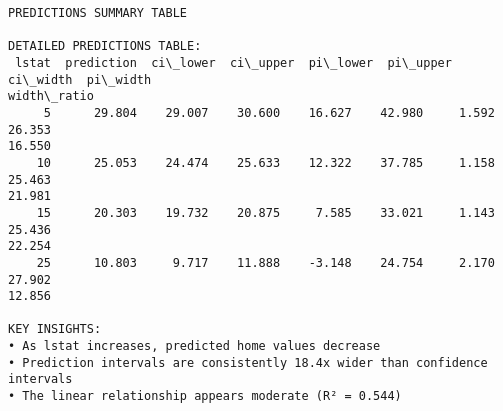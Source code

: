 \documentclass[8pt, twocolumn]{extarticle}
\begin{document}
    \centering
    \begin{Verbatim}[commandchars=\\\{\}]
PREDICTIONS SUMMARY TABLE

DETAILED PREDICTIONS TABLE:
 lstat  prediction  ci\_lower  ci\_upper  pi\_lower  pi\_upper  ci\_width  pi\_width
width\_ratio
     5      29.804    29.007    30.600    16.627    42.980     1.592    26.353
16.550
    10      25.053    24.474    25.633    12.322    37.785     1.158    25.463
21.981
    15      20.303    19.732    20.875     7.585    33.021     1.143    25.436
22.254
    25      10.803     9.717    11.888    -3.148    24.754     2.170    27.902
12.856

KEY INSIGHTS:
• As lstat increases, predicted home values decrease
• Prediction intervals are consistently 18.4x wider than confidence intervals
• The linear relationship appears moderate (R² = 0.544)
    \end{Verbatim}
\end{document}

